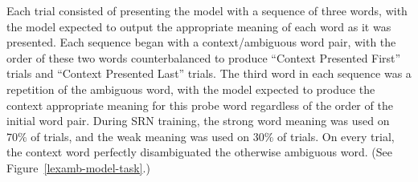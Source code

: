 Each trial consisted of presenting the model with a sequence of three words, with the model expected to output the appropriate meaning of each word as it was presented. Each sequence began with a context/ambiguous word pair, with the order of these two words counterbalanced to produce ``Context Presented First'' trials and ``Context Presented Last'' trials. The third word in each sequence was a repetition of the ambiguous word, with the model expected to produce the context appropriate meaning for this probe word regardless of the order of the initial word pair. During SRN training, the strong word meaning was used on $70\%$ of trials, and the weak meaning was used on $30\%$ of trials. On every trial, the context word perfectly disambiguated the otherwise ambiguous word. (See Figure~\ref{lexamb-model-task}.) 




